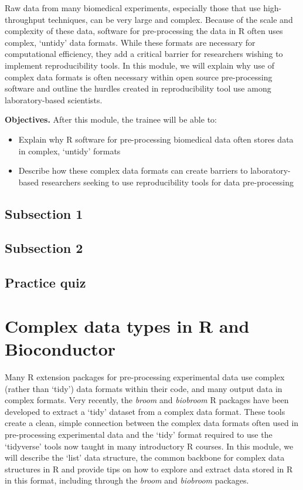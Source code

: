 \documentclass[]{tufte-book}
\providecommand{\tightlist}{%
  \setlength{\itemsep}{0pt}\setlength{\parskip}{0pt}}
\begin{document}
Raw data from many biomedical experiments, especially those that use
high-throughput techniques, can be very large and complex. Because of the scale
and complexity of these data, software for pre-processing the data in R often
uses complex, `untidy' data formats. While these formats are necessary for
computational efficiency, they add a critical barrier for researchers wishing to
implement reproducibility tools. In this module, we will explain why use of
complex data formats is often necessary within open source pre-processing
software and outline the hurdles created in reproducibility tool use among
laboratory-based scientists.

\textbf{Objectives.} After this module, the trainee will be able to:

\begin{itemize}
\tightlist
\item
  Explain why R software for pre-processing biomedical data often stores
  data in complex, `untidy' formats
\item
  Describe how these complex data formats can create barriers to
  laboratory-based researchers seeking to use reproducibility tools for
  data pre-processing
\end{itemize}

\hypertarget{subsection-1-10}{%
\subsection{Subsection 1}\label{subsection-1-10}}

\hypertarget{subsection-2-9}{%
\subsection{Subsection 2}\label{subsection-2-9}}

\hypertarget{practice-quiz-3}{%
\subsection{Practice quiz}\label{practice-quiz-3}}

\hypertarget{complex-data-types-in-r-and-bioconductor}{%
\section{Complex data types in R and Bioconductor}\label{complex-data-types-in-r-and-bioconductor}}

Many R extension packages for pre-processing experimental data use complex
(rather than `tidy') data formats within their code, and many output data in
complex formats. Very recently, the \emph{broom} and \emph{biobroom} R
packages have been developed to extract a `tidy' dataset from a complex data
format. These tools create a clean, simple connection between the complex data
formats often used in pre-processing experimental data and the `tidy' format
required to use the `tidyverse' tools now taught in many introductory R courses.
In this module, we will describe the `list' data structure, the common backbone
for complex data structures in R and provide tips on how to explore and extract
data stored in R in this format, including through the \emph{broom} and
\emph{biobroom} packages.
\end{document}
